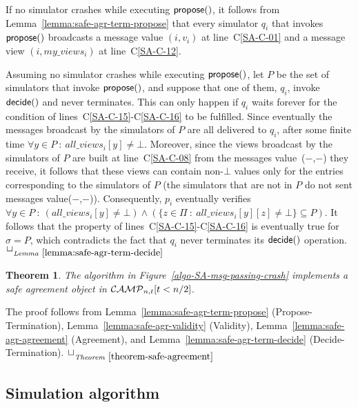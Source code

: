 \documentclass[11pt,letterpaper]{article}
\newtheorem{theorem}{Theorem}
\newlength {\afterproof}
\newcommand{\toto}{xxx}
\newenvironment{proofT}{\noindent{\bf Proof }}
{\hspace*{\fill}$\Box_{\mathit{Theorem}~\ref{\toto}}$\par\vspace{\afterproof}}
\newenvironment{proofL}{\noindent{\bf Proof }}
{\hspace*{\fill}$\Box_{\mathit{Lemma}~\ref{\toto}}$\par\vspace{\afterproof}}
\newcommand{\CM}{{\cal CAMP}_{n,t}}
\begin{document}
\begin{proofL}
If no simulator crashes while executing  ${\sf propose}()$,
it follows from Lemma~\ref{lemma:safe-agr-term-propose}
that every simulator $q_i$ that invokes  ${\sf propose}()$ broadcasts
a message  {\sc value} $(i,v_i)$ at line~C\ref{SA-C-01} and
a message  {\sc view} $(i,my\_views_i)$ at line~C\ref{SA-C-12}.

Assuming no  simulator  crashes while executing  ${\sf propose}()$,
let $P$ be the set of simulators that invoke ${\sf propose}()$, and
suppose that one of them, $q_i$, invoke ${\sf decide}()$ and never terminates.
This can only happen if $q_i$ waits forever for the condition of
lines~C\ref{SA-C-15}-C\ref{SA-C-16} to be fulfilled.
Since eventually the messages broadcast by the
simulators of $P$ are all delivered to $q_i$, after some finite time
$\forall y\in P~:~all\_views_i[y]\neq\bot$. Moreover, since
the views broadcast by the  simulators of $P$ are built at
line~C\ref{SA-C-08} from the messages {\sc value}~($-$,$-$)
they receive, it follows that these views can contain non-$\bot$ values
only for the entries corresponding to the simulators of $P$ (the simulators
that are not in $P$ do not sent  messages {\sc value}($-$,$-$)).
Consequently, $p_i$ eventually verifies $\forall y\in
P~:~(all\_views_i[y]\neq\bot)
\land (\{z\in\Pi~:~all\_views_i[y][z]\neq\bot\}\subseteq P)$.
It follows that the property of lines~C\ref{SA-C-15}-C\ref{SA-C-16} is
eventually true for $\sigma=P$, which contradicts the fact that $q_i$
never terminates its ${\sf decide}()$ operation.
\renewcommand{\toto}{lemma:safe-agr-term-decide}
\end{proofL}


\begin{theorem}
\label{theorem-safe-agreement}
The algorithm in Figure~{\em\ref{algo-SA-msg-passing-crash}}
implements a safe agreement object in $\CM[t<n/2]$.
\end{theorem}

\begin{proofT}
The proof follows from
Lemma~\ref{lemma:safe-agr-term-propose} (Propose-Termination),
Lemma~\ref{lemma:safe-agr-validity} (Validity),
Lemma~\ref{lemma:safe-agr-agreement} (Agreement),  and
Lemma~\ref{lemma:safe-agr-term-decide} (Decide-Termination).
\renewcommand{\toto}{theorem-safe-agreement}
\end{proofT}


\subsection{Simulation algorithm}
\end{document}
